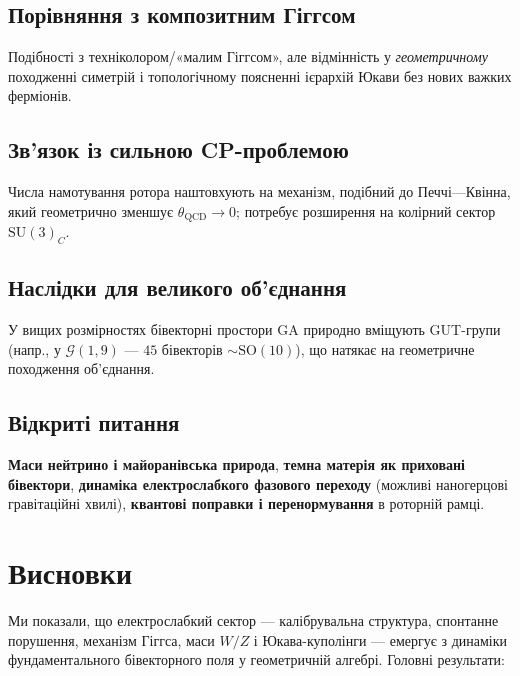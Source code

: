 \documentclass[11pt,a4paper]{article}
\newcommand{\SU}{\mathrm{SU}}
\newcommand{\SO}{\mathrm{SO}}
\theoremstyle{definition}
\theoremstyle{plain}
\theoremstyle{remark}
\begin{document}
\subsection{Порівняння з композитним Гіггсом}

Подібності з техніколором/«малим Гіггсом», але відмінність у \emph{геометричному} походженні симетрій і топологічному поясненні ієрархій Юкави без нових важких ферміонів.

\subsection{Зв’язок із сильною CP-проблемою}

Числа намотування ротора наштовхують на механізм, подібний до Печчі—Квінна, який геометрично зменшує $\theta_{\text{QCD}}\to 0$; потребує розширення на колірний сектор $\SU(3)_C$.

\subsection{Наслідки для великого об’єднання}

У вищих розмірностях бівекторні простори GA природно вміщують GUT-групи (напр., у $\mathcal{G}(1,9)$ — $45$ бівекторів $\sim \SO(10)$), що натякає на геометричне походження об’єднання.

\subsection{Відкриті питання}

\textbf{Маси нейтрино і майоранівська природа}, \textbf{темна матерія як приховані бівектори}, \textbf{динаміка електрослабкого фазового переходу} (можливі наногерцові гравітаційні хвилі), \textbf{квантові поправки і перенормування} в роторній рамці.

\vspace{1em}

\section{Висновки}\label{sec:conclusion}

Ми показали, що електрослабкий сектор — калібрувальна структура, спонтанне порушення, механізм Гіггса, маси $W/Z$ і Юкава-куполінги — емергує з динаміки фундаментального бівекторного поля у геометричній алгебрі. Головні результати:
\end{document}
